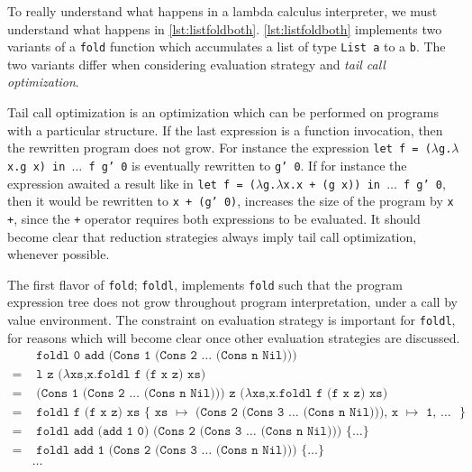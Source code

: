 To really understand what happens in a lambda calculus interpreter, we must understand what happens in \autoref{lst:listfoldboth}.
\autoref{lst:listfoldboth} implements two variants of a \texttt{fold} function which accumulates a list of type \texttt{List a} to a \texttt{b}.
The two variants differ when considering evaluation strategy and \textit{tail call optimization}.
\begin{remark}\label{remark:tailcall}
	Tail call optimization is an optimization which can be performed on programs with a particular structure.
	If the last expression is a function invocation, then the rewritten program does not grow.
	For instance the expression \texttt{let f = ($\lambda$g.$\lambda$x.g x) in $\dots$ f g' 0} is eventually rewritten to \texttt{g' 0}.
	If for instance the expression awaited a result like in \texttt{let f = ($\lambda$g.$\lambda$x.x + (g x)) in $\dots$ f g' 0}, then it would be rewritten to \texttt{x + (g' 0)}, increases the size of the program by \texttt{x +}, since the \texttt{+} operator requires both expressions to be evaluated.
	It should become clear that reduction strategies always imply tail call optimization, whenever possible.
\end{remark}
The first flavor of \texttt{fold}; \texttt{foldl}, implements \texttt{fold} such that the program expression tree does not grow throughout program interpretation, under a call by value environment.
The constraint on evaluation strategy is important for \texttt{foldl}, for reasons which will become clear once other evaluation strategies are discussed.
\begin{align}
	  & \texttt{ foldl 0 add (Cons 1 (Cons 2 $\dots$ (Cons n Nil)))}                                                                \\
	= & \texttt{ l z ($\lambda$xs,x.foldl f (f x z) xs)}  \tag*{}                                                                   \\
	= & \texttt{ (Cons 1 (Cons 2 $\dots$ (Cons n Nil))) z ($\lambda$xs,x.foldl f (f x z) xs)}  \tag*{}                              \\
	= & \texttt{ foldl f (f x z) xs $\{$ xs $\mapsto$ (Cons 2 (Cons 3 $\dots$ (Cons n Nil))), x $\mapsto$ 1, $\dots$ $\}$}  \tag*{} \\
	= & \texttt{ foldl add (add 1 0) (Cons 2 (Cons 3 $\dots$ (Cons n Nil))) $\{ \dots \}$}  \tag*{}                                 \\
	= & \texttt{ foldl add 1 (Cons 2 (Cons 3 $\dots$ (Cons n Nil))) $\{ \dots \}$}  \tag*{}                                         \\
	  & \dots \tag*{}
\end{align}
